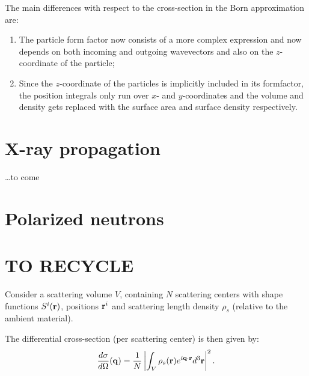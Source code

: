 The main differences with respect to the cross-section in the Born approximation are:
\begin{enumerate}
  \item The particle form factor now consists of a more complex expression and now depends on both incoming and outgoing wavevectors and also on the $z$-coordinate of the particle;
  \item Since the $z$-coordinate of the particles is implicitly included in its formfactor, the position integrals only run over $x$- and $y$-coordinates and the volume and density gets replaced with the surface area and surface density respectively.
\end{enumerate}

\section{X-ray propagation}\label{Sxray}

\ldots to come


\section{Polarized neutrons}\label{Snpol}



\section{TO RECYCLE}

Consider a scattering volume $V$, containing $N$ scattering centers with shape functions $S^i(\mathbf{r})$, positions $\mathbf{r}^i$ and scattering length density $\rho_s$ (relative to the ambient material).

The differential cross-section (per scattering center) is then given by:
\begin{equation}\label{Exsec1}
  \frac{d\sigma}{d\Omega}(\mathbf{q}) = \frac{1}{N}\left\lvert \int_V \rho_s(\mathbf{r}) e^{i\mathbf{q}\cdot\mathbf{r}} d^3\mathbf{r} \right\rvert ^2.
\end{equation}

